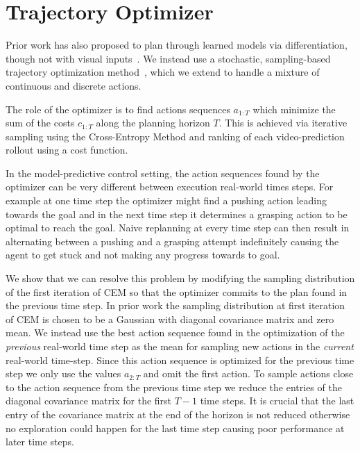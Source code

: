 \section{Trajectory Optimizer}
\label{sec:optimizer}
Prior work has also proposed to plan through learned models via differentiation, though not with visual inputs~\cite{deep_mpc}. We instead use a stochastic, sampling-based trajectory optimization method~\cite{cem-rk-13,foresight}, which we extend to handle a mixture of continuous and discrete actions.

The role of the optimizer is to find actions sequences $a_{1:T}$ which minimize the sum of the costs $c_{1:T}$ along the planning horizon $T$. This is achieved via iterative sampling using the Cross-Entropy Method and ranking of each video-prediction rollout using a cost function. 

In the model-predictive control setting, the action sequences found by the optimizer can be very different between execution real-world times steps. For example at one time step the optimizer might find a pushing action leading towards the goal and in the next time step it determines a grasping action to be optimal to reach the goal. Naive replanning at every time step can then result in alternating between a pushing and a grasping attempt indefinitely causing the agent to get stuck and not making any progress towards to goal. 

We show that we can resolve this problem by modifying the sampling distribution of the first iteration of CEM so that the optimizer commits to the plan found in the previous time step. In prior work \cite{sna} the sampling distribution at first iteration of CEM is chosen to be a Gaussian with diagonal covariance matrix and zero mean. We instead use the best action sequence found in the optimization of the \emph{previous} real-world time step as the mean for sampling new actions in the \emph{current} real-world time-step. Since this action sequence is optimized for the previous time step we only use the values $a_{2:T}$ and omit the first action. To sample actions close to the action sequence from the previous time step we reduce the entries of the diagonal covariance matrix for the first $T-1$ time steps. It is crucial that the last entry of the covariance matrix at the end of the horizon is not reduced otherwise no exploration could happen for the last time step causing poor performance at later time steps.